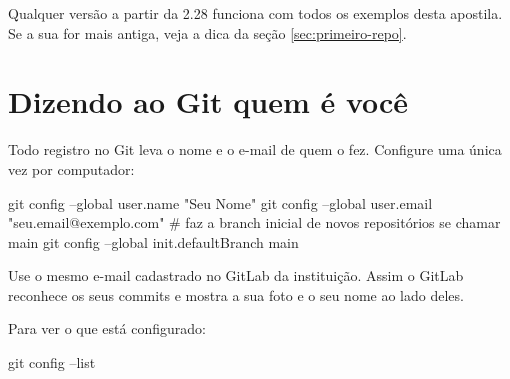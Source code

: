 Qualquer versão a partir da 2.28 funciona com todos os exemplos desta apostila. Se a sua for mais antiga, veja a dica da seção \ref{sec:primeiro-repo}.

\section{Dizendo ao Git quem é você}

Todo registro no Git leva o nome e o e-mail de quem o fez. Configure uma única vez por computador:

\begin{terminal}
git config --global user.name "Seu Nome"
git config --global user.email "seu.email@exemplo.com"
# faz a branch inicial de novos repositórios se chamar main
git config --global init.defaultBranch main
\end{terminal}

\begin{dica}
Use o mesmo e-mail cadastrado no GitLab da instituição. Assim o GitLab reconhece os seus commits e mostra a sua foto e o seu nome ao lado deles.
\end{dica}

Para ver o que está configurado:

\begin{terminal}
git config --list
\end{terminal}
